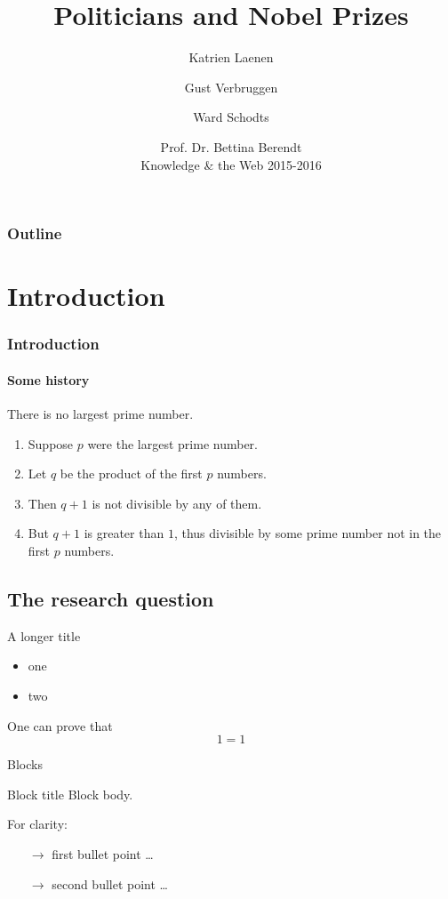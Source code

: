 \documentclass[nonav,sleutel]{beamer}
\title{Politicians and Nobel Prizes}
\date[ISPN '80]{Prof. Dr. Bettina Berendt\\ Knowledge \& the Web 2015-2016}
\author{Katrien Laenen \and Gust Verbruggen \and Ward Schodts}
\begin{document}

\begin{frame}
\titlepage
\end{frame}


\begin{frame}[noframenumbering]
\frametitle{Outline} 
  \tableofcontents[hideallsubsections
  ]

\end{frame}



\section{Introduction}
\begin{frame}
\frametitle{Introduction} 
\framesubtitle{Some history} 
\begin{theorem}
There is no largest prime number. \end{theorem} 
\begin{enumerate} 
\item<1-| alert@1> Suppose $p$ were the largest prime number. 
\item<2-> Let $q$ be the product of the first $p$ numbers. 
\item<3-> Then $q+1$ is not divisible by any of them. 
\item<1-> But $q + 1$ is greater than $1$, thus divisible by some prime
number not in the first $p$ numbers.
\end{enumerate}
\end{frame}

\subsection{The research question}
\begin{frame}{A longer title}
\begin{itemize}
\item one
\item two
\end{itemize}

One can prove that
\[
	1 = 1
\]
\end{frame}

\begin{frame}{Blocks}
\begin{block}{Block title}
Block body.
\end{block}
\begin{example}
For clarity:
\begin{itemize}
	\item[$\rightarrow$] first bullet point \ldots
	\item[$\rightarrow$] second bullet  point \ldots
\end{itemize}
\end{example}
\end{frame}
\end{document}
